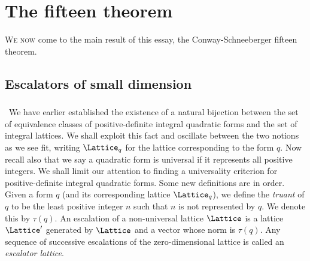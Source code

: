 \chapter{The fifteen theorem}
\label{chap:conway-schneeberger}

{\scshape We now} come to the main result of this essay, the Conway-Schneeberger
fifteen theorem. 

\section{Escalators of small dimension}

\subsection{}~We have earlier established the existence of a natural bijection
between the set of equivalence classes of positive-definite integral quadratic
forms and the set of integral lattices. We shall exploit this fact and oscillate
between the two notions as we see fit, writing \(\Lattice_q\) for the lattice
corresponding to the form \(q\). Now recall also that we say a quadratic form is
universal if it represents all positive integers. We shall limit our attention
to finding a universality criterion for positive-definite integral quadratic
forms. Some new definitions are in order. Given a form \(q\) (and its
corresponding lattice \(\Lattice_q\)), we define the \emph{truant} of \(q\) to
be the least positive integer \(n\) such that \(n\) is not represented by \(q\).
We denote this by \(\tau(q)\). An escalation of a non-universal lattice
\(\Lattice\) is a lattice \(\Lattice'\) generated by \(\Lattice\) and a vector
whose norm is \(\tau(q)\). Any sequence of successive escalations of the
zero-dimensional lattice is called an \emph{escalator lattice}.

